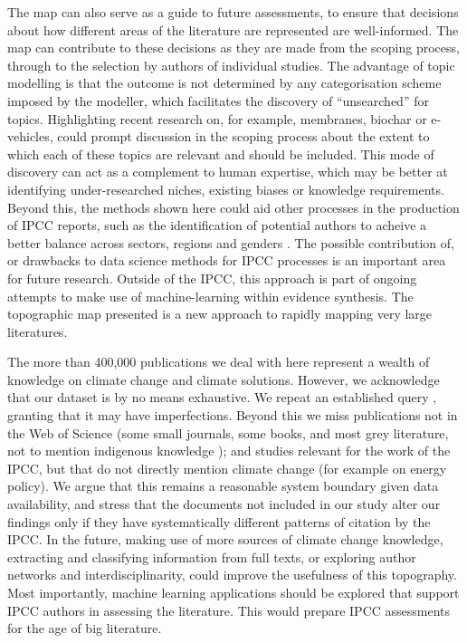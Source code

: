 \documentclass{article}
\begin{document}
\begin{linenumbers}
		
		The map can also serve as a guide to future assessments, to ensure that decisions about how different areas of the literature are represented are well-informed. 
		The map can contribute to these decisions as they are made from the scoping process, through to the selection by authors of individual studies.
		The advantage of topic modelling is that the outcome is not determined by any categorisation scheme imposed by the modeller, which facilitates the discovery of ``unsearched'' for topics. Highlighting recent research on, for example, membranes, biochar or e-vehicles, could prompt discussion in the scoping process about the extent to which each of these topics are relevant and should be included.
		This mode of discovery can act as a complement to human expertise, which may be better at identifying under-researched niches, existing biases or knowledge requirements.
		Beyond this, the methods shown here could aid other processes in the production of IPCC reports, such as the identification of potential authors to acheive a better balance across sectors, regions and genders \cite{Corbera2016}. The possible contribution of, or drawbacks to data science methods for IPCC processes is an important area for future research.
		Outside of the IPCC, this approach is part of ongoing attempts to make use of machine-learning within evidence synthesis. The topographic map presented is a new approach to rapidly mapping very large literatures. 
		
		The more than 400,000 publications we deal with here represent a wealth of knowledge on climate change and climate solutions. However, we acknowledge that our dataset is by no means exhaustive. We repeat an established query \cite{Haunschild2016}, granting that it may have imperfections. Beyond this we miss publications not in the Web of Science (some small journals, some books, and most grey literature, not to mention indigenous knowledge \cite{Ford2016b}); and studies relevant for the work of the IPCC, but that do not directly mention climate change (for example on energy policy). We argue that this remains a reasonable system boundary given data availability, and stress that the documents not included in our study alter our findings only if they have systematically different patterns of citation by the IPCC. In the future, making use of more sources of climate change knowledge, extracting and classifying information from full texts, or exploring author networks and interdisciplinarity, could improve the usefulness of this topography. Most importantly, machine learning applications should be explored that support IPCC authors in assessing the literature. This would prepare IPCC assessments for the age of big literature.
		
		
	\end{linenumbers}
	
	\appendix
	
	\linespread{1}
	
	
	
	
	
\end{document}
